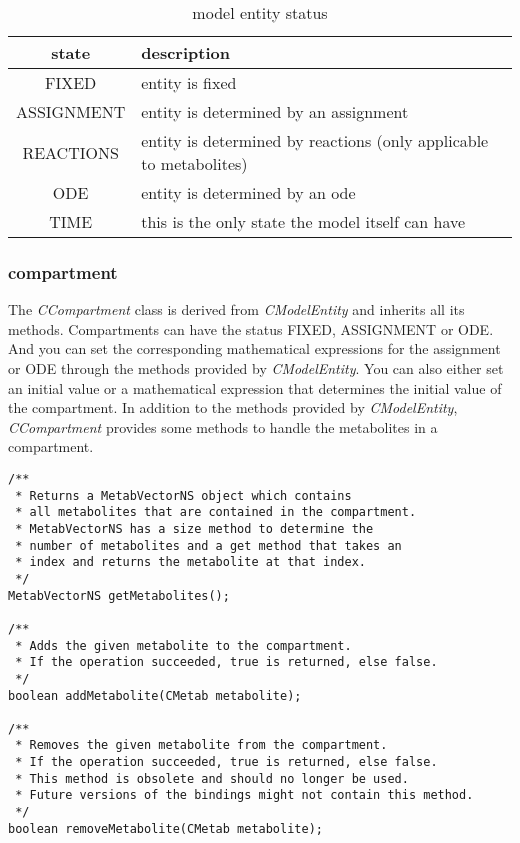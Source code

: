 \documentclass[a4,10pt]{article}
\begin{document}
\begin{table}[ht]
\begin{tabular}{c|l}
state & description \\ \hline \hline
FIXED & entity is fixed \\ \hline
ASSIGNMENT & entity is determined by an assignment \\ \hline
REACTIONS & entity is determined by reactions (only applicable to metabolites) \\ \hline
ODE & entity is determined by an ode \\ \hline
TIME & this is the only state the model itself can have \\ \hline
\end{tabular}
\caption{model entity status}
\label{ModelEntityStatus}
\end{table}

\subsubsection{compartment}
The \textit{CCompartment} class is derived from \textit{CModelEntity} and inherits all its methods. Compartments can have the status FIXED, ASSIGNMENT or ODE. And you can set the corresponding mathematical expressions for the assignment or ODE through the methods provided by \textit{CModelEntity}. You can also either set an initial value or a mathematical expression that determines the initial value of the compartment.
In addition to the methods provided by \textit{CModelEntity}, \textit{CCompartment} provides some methods to handle the metabolites in a compartment.

\begin{lstlisting}
/**
 * Returns a MetabVectorNS object which contains 
 * all metabolites that are contained in the compartment.
 * MetabVectorNS has a size method to determine the
 * number of metabolites and a get method that takes an 
 * index and returns the metabolite at that index.
 */
MetabVectorNS getMetabolites();

/**
 * Adds the given metabolite to the compartment.
 * If the operation succeeded, true is returned, else false.
 */
boolean addMetabolite(CMetab metabolite);

/**
 * Removes the given metabolite from the compartment.
 * If the operation succeeded, true is returned, else false.
 * This method is obsolete and should no longer be used.
 * Future versions of the bindings might not contain this method.
 */
boolean removeMetabolite(CMetab metabolite);
\end{lstlisting}
\end{document}
